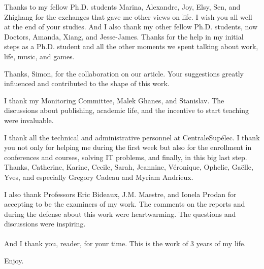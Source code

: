 \documentclass[../main.tex]{subfiles}
\begin{document}
Thanks to my fellow Ph.D. students Marina, Alexandre, Joy, Elsy, Sen, and Zhighang for the exchanges that gave me other views on life.
I wish you all well at the end of your studies.
And I also thank my other fellow Ph.D. students, now Doctors, Amanda, Xiang, and Jesse-James.
Thanks for the help in my initial steps as a Ph.D. student and all the other moments we spent talking about work, life, music, and games.

Thanks, Simon, for the collaboration on our article. Your suggestions greatly influenced and contributed to the shape of this work.

I thank my Monitoring Committee, Malek Ghanes, and Stanislav.
The discussions about publishing, academic life, and the incentive to start teaching were invaluable.

I thank all the technical and administrative personnel at CentraleSupélec. I thank you not only for helping me during the first week but also for the enrollment in conferences and courses, solving IT problems, and finally, in this big last step. Thanks, Catherine, Karine, Cecile, Sarah, Jeannine, Véronique, Ophelie, Gaëlle, Yves, and especially Gregory Cadeau and Myriam Andrieux.

I also thank Professors Eric Bideaux, J.M. Maestre, and Ionela Prodan for accepting to be the examiners of my work.
The comments on the reports and during the defense about this work were heartwarming. The questions and discussions were inspiring.
\\~\\
And I thank you, reader, for your time. This is the work of 3 years of my life.

Enjoy.
\vfill
\end{document}
